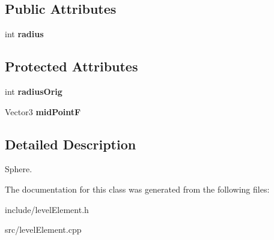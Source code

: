 \subsection*{\-Public \-Attributes}
\begin{DoxyCompactItemize}
\item 
\hypertarget{classLevelElementSphere_ab0e93cce0e9e3251aca1dc6ac6efb953}{
int {\bfseries radius}}
\label{d8/d73/classLevelElementSphere_ab0e93cce0e9e3251aca1dc6ac6efb953}

\end{DoxyCompactItemize}
\subsection*{\-Protected \-Attributes}
\begin{DoxyCompactItemize}
\item 
\hypertarget{classLevelElementSphere_a12d3e3ad93f69d9eb845f078919998e9}{
int {\bfseries radius\-Orig}}
\label{d8/d73/classLevelElementSphere_a12d3e3ad93f69d9eb845f078919998e9}

\item 
\hypertarget{classLevelElementSphere_a33d1a201999580b8a6ae0700a13b1a13}{
\-Vector3 {\bfseries mid\-Point\-F}}
\label{d8/d73/classLevelElementSphere_a33d1a201999580b8a6ae0700a13b1a13}

\end{DoxyCompactItemize}


\subsection{\-Detailed \-Description}
\-Sphere. 

\-The documentation for this class was generated from the following files\-:\begin{DoxyCompactItemize}
\item 
include/level\-Element.\-h\item 
src/level\-Element.\-cpp\end{DoxyCompactItemize}
